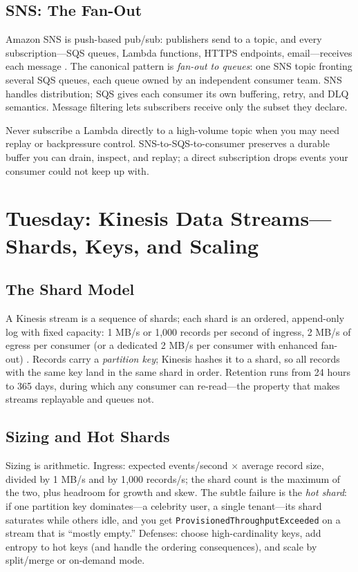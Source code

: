 \subsection{SNS: The Fan-Out}
Amazon SNS is push-based pub/sub: publishers send to a topic, and every subscription---SQS queues, Lambda functions, HTTPS endpoints, email---receives each message \cite{awsSNSDocs}. The canonical pattern is \emph{fan-out to queues}: one SNS topic fronting several SQS queues, each queue owned by an independent consumer team. SNS handles distribution; SQS gives each consumer its own buffering, retry, and DLQ semantics. Message filtering lets subscribers receive only the subset they declare.

\begin{tipbox}
Never subscribe a Lambda directly to a high-volume topic when you may need replay or backpressure control. SNS-to-SQS-to-consumer preserves a durable buffer you can drain, inspect, and replay; a direct subscription drops events your consumer could not keep up with.
\end{tipbox}

\section{Tuesday: Kinesis Data Streams---Shards, Keys, and Scaling}
\subsection{The Shard Model}
A Kinesis stream is a sequence of shards; each shard is an ordered, append-only log with fixed capacity: 1 MB/s or 1{,}000 records per second of ingress, 2 MB/s of egress per consumer (or a dedicated 2 MB/s per consumer with enhanced fan-out) \cite{awsKinesisDocs}. Records carry a \emph{partition key}; Kinesis hashes it to a shard, so all records with the same key land in the same shard in order. Retention runs from 24 hours to 365 days, during which any consumer can re-read---the property that makes streams replayable and queues not.

\subsection{Sizing and Hot Shards}
Sizing is arithmetic. Ingress: expected events/second $\times$ average record size, divided by 1 MB/s and by 1{,}000 records/s; the shard count is the maximum of the two, plus headroom for growth and skew. The subtle failure is the \emph{hot shard}: if one partition key dominates---a celebrity user, a single tenant---its shard saturates while others idle, and you get \texttt{ProvisionedThroughputExceeded} on a stream that is ``mostly empty.'' Defenses: choose high-cardinality keys, add entropy to hot keys (and handle the ordering consequences), and scale by split/merge or on-demand mode.

